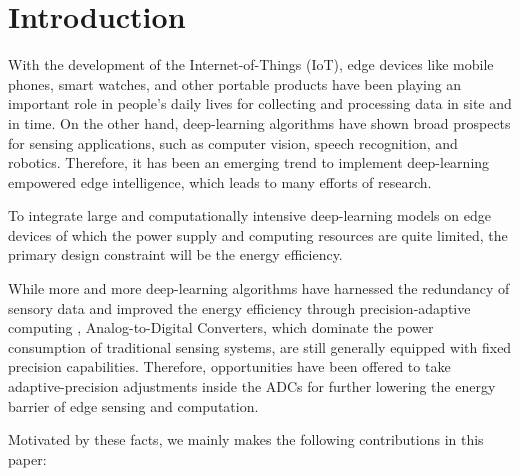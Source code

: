 \section{Introduction}

With the development of the Internet-of-Things (IoT), edge devices like mobile phones, smart watches, and other portable products have been playing an important role in people’s daily lives 
for collecting and processing data in site and in time. On the other hand, deep-learning algorithms have shown broad prospects for sensing applications, such as computer vision, speech recognition, 
and robotics. Therefore, it has been an emerging trend to implement deep-learning empowered edge intelligence, which leads to many efforts of research. 

To integrate large and computationally intensive deep-learning models on edge devices of which the power supply and computing resources are quite limited, the primary design constraint will be the energy efficiency.

While more and more deep-learning algorithms have harnessed the redundancy of sensory data and improved the energy efficiency through precision-adaptive computing \cite{leibe_xnor-net_2016}\cite{li_ternary_2016}\cite{park_energy-efficient_2018}, 
Analog-to-Digital Converters, which dominate the power consumption of 
traditional sensing systems, are still generally equipped with fixed precision capabilities. Therefore, opportunities have been offered to take adaptive-precision adjustments inside the ADCs for further lowering the energy barrier of edge sensing and computation. 


Motivated by these facts, we mainly makes the following contributions in this paper:

